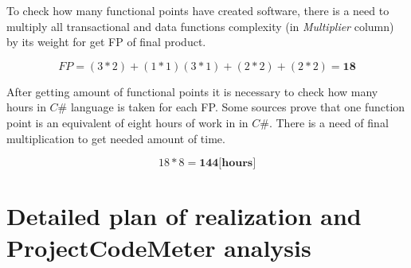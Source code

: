 \documentclass[a4paper,10pt]{report}
\begin{document}
To check how many functional points have created software, there is a need to multiply all transactional and data functions complexity (in \textit{Multiplier} column) by its weight for get FP of final product.

\[
FP = (3\ast2 )+(1\ast1)(3\ast1)+(2\ast2)+(2\ast2)= \textbf{18}
\]

After getting amount of functional points it is necessary to check how many hours in $C\#$ language is taken for each FP.  Some sources prove that one function point is an equivalent of eight hours of work in in $C\#$. There is a need of final multiplication to get needed amount of time.

\[
18\ast8 =  \textbf{144[hours]}
\]

\section{Detailed plan of realization and ProjectCodeMeter analysis}
\end{document}
